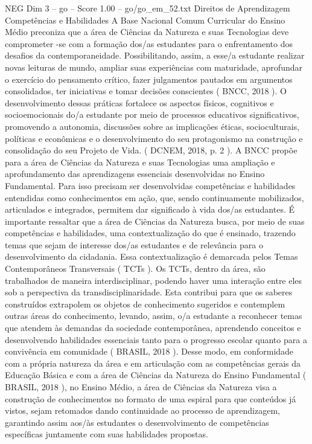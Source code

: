 \begin{textsample}{NEG Dim 3 – go – Score 1.00 – go/go\_em\_52.txt}  \label{ex:f3_neg_249}
Direitos de Aprendizagem Competências e Habilidades A Base Nacional Comum Curricular do Ensino Médio preconiza que a área de Ciências da Natureza e suas Tecnologias deve comprometer -se com a formação dos/as estudantes para o enfrentamento dos desafios da contemporaneidade.
Possibilitando, assim, a esse/a estudante realizar novas leituras de mundo, ampliar suas experiências com maturidade, aprofundar o exercício do pensamento crítico, fazer julgamentos pautados em argumentos consolidados, ter iniciativas e tomar decisões conscientes ( BNCC, 2018 ).
O desenvolvimento dessas práticas fortalece os aspectos físicos, cognitivos e socioemocionais do/a estudante por meio de processos educativos significativos, promovendo a autonomia, discussões sobre as implicações éticas, socioculturais, políticas e econômicas e o desenvolvimento do seu protagonismo na construção e consolidação do seu Projeto de Vida. ( DCNEM, 2018, p. 2 ).
A BNCC propõe para a área de Ciências da Natureza e suas Tecnologias uma ampliação e aprofundamento das aprendizagens essenciais desenvolvidas no Ensino Fundamental.
Para isso precisam ser desenvolvidas competências e habilidades entendidas como conhecimentos em ação, que, sendo continuamente mobilizados, articulados e integrados, permitem dar significado à vida dos/as estudantes.
É importante ressaltar que a área de Ciências da Natureza busca, por meio de suas competências e habilidades, uma contextualização do que é ensinado, trazendo temas que sejam de interesse dos/as estudantes e de relevância para o desenvolvimento da cidadania.
Essa contextualização é demarcada pelos Temas Contemporâneos Transversais ( TCTs ).
Os TCTs, dentro da área, são trabalhados de maneira interdisciplinar, podendo haver uma interação entre eles sob a perspectiva da transdisciplinaridade.
Esta contribui para que os saberes construídos extrapolem os objetos de conhecimento sugeridos e contemplem outras áreas do conhecimento, levando, assim, o/a estudante a reconhecer temas que atendem às demandas da sociedade contemporânea, aprendendo conceitos e desenvolvendo habilidades essenciais tanto para o progresso escolar quanto para a convivência em comunidade ( BRASIL, 2018 ).
Desse modo, em conformidade com a própria natureza da área e em articulação com as competências gerais da Educação Básica e com a área de Ciências da Natureza do Ensino Fundamental ( BRASIL, 2018 ), no Ensino Médio, a área de Ciências da Natureza visa a construção de conhecimentos no formato de uma espiral para que conteúdos já vistos, sejam retomados dando continuidade ao processo de aprendizagem, garantindo assim aos/às estudantes o desenvolvimento de competências específicas juntamente com suas habilidades propostas.

\end{textsample}

